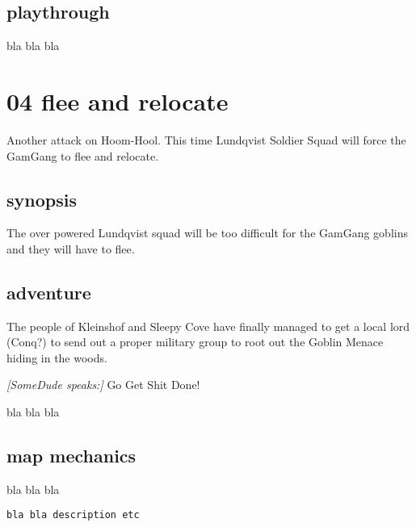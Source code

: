 \subsection*{playthrough}

bla bla bla









\newpage
\section*{04 flee and relocate}


Another attack on Hoom-Hool. This time Lundqvist Soldier Squad will force the GamGang to flee and relocate.


\subsection*{synopsis}

The over powered Lundqvist squad will be too difficult for the GamGang goblins and they will have to flee.


\subsection*{adventure}

The people of Kleinshof and Sleepy Cove have finally managed to get a local lord (Conq?) to send out a proper military group to root out the Goblin Menace hiding in the woods.

\begin{readoutloud}
\emph{[SomeDude speaks:]}
Go Get Shit Done!
\end{readoutloud}

\noindent bla bla bla

\subsection*{map mechanics}

bla bla bla

\small \begin{verbatim}
bla bla description etc
\end{verbatim} \normalsize


